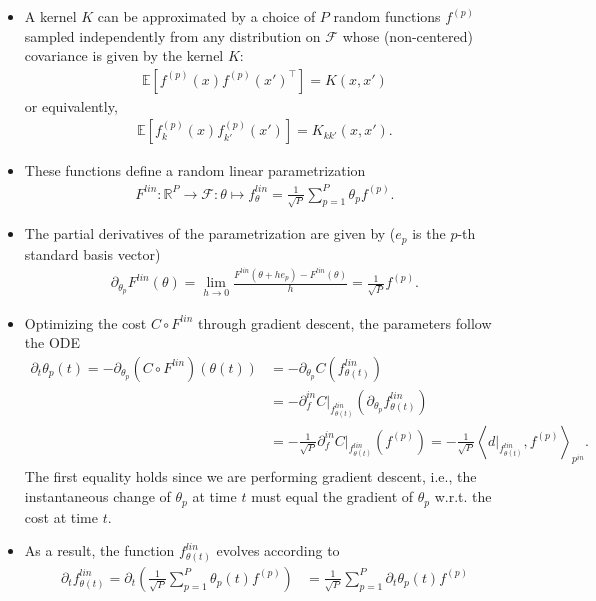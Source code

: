 \documentclass[10pt]{article}
\newcommand{\RR}{\mathbb{R}}
\newcommand{\EE}{\mathbb{E}}
\newcommand{\FF}{\mathcal{F}}
\newcommand{\inner}[2]{\left\langle #1, #2 \right\rangle}
\newcommand{\paran}[1]{{( #1 )}}
\newcommand{\pin}{{p^{in}}}
\newcommand{\din}{\partial^{in}}
\begin{document}
\begin{itemize}
\item A kernel $K$ can be approximated by a choice of $P$ random functions $f^\paran{p}$ sampled independently from any distribution on $\FF$ whose (non-centered) covariance is given by the kernel $K$:
\begin{align*}
\EE [f^\paran{p}(x) f^\paran{p}(x')^\top] = K(x,x')
\end{align*}
or equivalently,
\begin{align*}
\EE [f^\paran{p}_k(x) f^\paran{p}_{k'}(x')] = K_{kk'}(x,x').
\end{align*}
\item These functions define a random linear parametrization
\begin{align*}
F^{lin} : \RR^P \rightarrow \FF : \theta \mapsto f^{lin}_\theta = \frac{1}{\sqrt{P}} \sum_{p = 1}^P \theta_p f^\paran{p}.
\end{align*}
\item The partial derivatives of the parametrization are given by ($e_p$ is the $p$-th standard basis vector)
\begin{align*}
\partial_{\theta_p} F^{lin}(\theta) = \lim_{h \rightarrow 0} \frac{F^{lin}(\theta + h e_p) - F^{lin}(\theta)}{h} = \frac{1}{\sqrt{P}} f^\paran{p}.
\end{align*}
\item Optimizing the cost $C \circ F^{lin}$ through gradient descent, the parameters follow the ODE
\begin{align*}
\partial_t \theta_p(t) = -\partial_{\theta_p} (C \circ F^{lin})(\theta(t)) &= -\partial_{\theta_p} C(f^{lin}_{\theta(t)}) \\
&= - \din_f C|_{f^{lin}_{\theta(t)}}(\partial_{\theta_p} f^{lin}_{\theta(t)}) \\
&= -\frac{1}{\sqrt{P}} \din_f C|_{f^{lin}_{\theta(t)}}(f^\paran{p}) = -\frac{1}{\sqrt{P}} \inner{d|_{f^{lin}_{\theta(t)}}}{f^\paran{p}}_\pin.
\end{align*}
The first equality holds since we are performing gradient descent, i.e., the instantaneous change of $\theta_p$ at time $t$ must equal the gradient of $\theta_p$ w.r.t. the cost at time $t$.
\item As a result, the function $f^{lin}_{\theta(t)}$ evolves according to
\begin{align*}
\partial_t f^{lin}_{\theta(t)} = \partial_t \left( \frac{1}{\sqrt{P}} \sum_{p = 1}^P \theta_p(t) f^\paran{p} \right) &= \frac{1}{\sqrt{P}} \sum_{p = 1}^P \partial_t \theta_p(t) f^\paran{p} \\

\end{align*}
\end{itemize}
\end{document}
